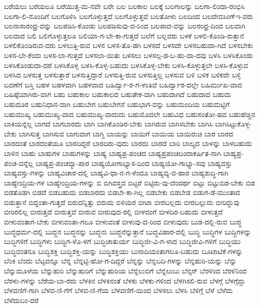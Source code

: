{ಬರೆಯಲು
ಬರೆಯಲೂ
ಬರೆಯುತ್ತ-ಮ-ನವೇ
ಬರೇ
ಬಲ
ಬಲಕಾಲ
ಬಲಕ್ಕೆ
ಬಲಗಾಲನ್ನು
ಬಲಗಾ-ಲಿಂದಾ-ರಂಭಿಸಿ
ಬಲಗಾ-ಲಿ-ನೊಂದಿಗೆ
ಬಲಗೊಳಿಸಿ
ಬಲಗೊಳ್ಳುತ್ತದೆ
ಬಲಗೊಳ್ಳುತ್ತವೆ
ಬಲತೋಳು
ಬಲದಿಂದ
ಬಲದೇವಸಿಂಗ್ಇ-ವರು
ಬಲನಾಸಾರಂಧ್ರ-ವನ್ನು
ಬಲಪಡಿಸಿ-ಕೊಂಡು
ಬಲಪಡಿಸುವು-ದ-ರಿಂದ
ಬಲಪಾದ-ವನ್ನು
ಬಲರಂಧ್ರ-ದಿಂದ
ಬಲವಾಗಿ
ಬಲವಾದ
ಬಲಿ
ಬಲಿಗೊಳ್ಳುತ್ತಲೂ
ಬಲಿಯಾ-ಗ-ಬೇ-ಕಾ-ಗುತ್ತದೆ
ಬಲೆಗೆ
ಬಲ್ಲವರು
ಬಳಕೆ
ಬಳಲಿ-ಕೊಂಡಿ-ರುತ್ತಾನೆ
ಬಳಲಿಕೊಂಡಿರುವ-ವರು
ಬಳಲುತ್ತಿ-ರುವ
ಬಳಸ
ಬಳಸ-ತೊ-ಡಗಿ
ಬಳಸದೆ
ಬಳಸದೇ
ಬಳಸಬಹುದಾ-ಗಿದೆ
ಬಳಸಬೇಕು
ಬಳಸ-ಬೇ-ಕೆಂದು
ಬಳಸ-ಲಾ-ಗುತ್ತದೆ
ಬಳಸಲಾ-ಯಿತು
ಬಳಸಲು
ಬಳಸಲ್ಪ-ಡ-ಬ-ಹು-ದಾ-ದವು
ಬಳಸಿ
ಬಳಸಿಕೊಂಡು
ಬಳಸಿಕೊಂಡುದಾ-ದರೆ
ಬಳಸಿಕೊಳ್ಳ
ಬಳಸಿ-ಕೊಳ್ಳ-ಬಹುದು
ಬಳಸಿಕೊಳ್ಳ-ಬೇಕು
ಬಳಸಿ-ಕೊಳ್ಳುತ್ತಲೇ
ಬಳಸಿ-ಕೊಳ್ಳುವ
ಬಳಸಿದ
ಬಳಸುತ್ತ
ಬಳಸುತ್ತಾರೆ
ಬಳಸುತ್ತಿದ್ದಾರೆ
ಬಳಸುತ್ತಿ-ರುವ
ಬಳಸುತ್ತಿಲ್ಲ
ಬಳಸುವ
ಬಳಿ
ಬಳಿಕ
ಬಳಿಕವೇ
ಬಳ್ಳಿ
ಬವಣೆಗೆ
ಬಸ್ತಿ
ಬಹಳ
ಬಹಳವಾಗಿ
ಬಹಳವಾದ
ಬಹಿರ್ದ್ವಾ-ರ-ಗ-ಳಂತಿವೆ
ಬಹಿರ್ದ್ವಾರ-ದಲ್ಲೇ
ಬಹಿರ್ಮುಖ-ವಾದ
ಬಹಿಷ್ಠೆಯಾಗಿರು-ವಾಗ
ಬಹು
ಬಹುಕಾಲ
ಬಹುಕಾಲದ
ಬಹುತೇಕ-ವಾಗಿ
ಬಹುದಾಗಿದೆ
ಬಹುದಾದ
ಬಹುದು
ಬಹುದೂರ
ಬಹುನಿಧಾನ-ವಾಗಿ
ಬಹುಬೇಗ
ಬಹುಬೇಗನೆ
ಬಹುಭಾಗ-ವನ್ನು
ಬಹುಮಂದಿಯ
ಬಹುಮಟ್ಟಿಗೆ
ಬಹುಮುಖ್ಯ
ಬಹುಮುಖ್ಯ-ವಾದ
ಬಹುಮುಖ್ಯ-ವಾದುದು
ಬಹುಮೊದಲೇ
ಬಹುವಿಧ
ಬಹುಸಂತೋ-ಷದ
ಬಹುಹೆಚ್ಚಿನ
ಬಾಕಿಯನ್ನೆಲ್ಲ
ಬಾಗದೆ
ಬಾಗಬಾರದು
ಬಾಗಿ
ಬಾಗಿಕೊಂಡಿರ-ಬೇಕು
ಬಾಗಿರುವ
ಬಾಗಿಸಬೇಕು
ಬಾಗಿಸಿ
ಬಾಗಿಸಿಟ್ಟುಕೊಳ್ಳ-ಬೇಕು
ಬಾಗಿಸುತ್ತ
ಬಾಗಿಸುವ
ಬಾಗುವಾಗ
ಬಾಗ್ಚಿ
ಬಾಯನ್ನು
ಬಾಯಿಗೆ
ಬಾಯಿಯ
ಬಾಯಿರುಚಿ
ಬಾರ
ಬಾರದ
ಬಾರದಂತೆ
ಬಾರದಂತೆಯೂ
ಬಾರದಿದ್ದರೆ
ಬಾರದಿರು-ವುದು
ಬಾರದು
ಬಾರದೆ
ಬಾರಿ
ಬಾಲ್ಯದ
ಬಾಳನ್ನು
ಬಾಳಬಹುದು
ಬಾಳಿನ
ಬಾಹು
ಬಾಹುಗಳ
ಬಾಹುಗಳನ್ನು
ಬಾಹ್ಯ
ಬಾಹ್ಯಪ್ರ-ಪಂಚದ
ಬಾಹ್ಯಪ್ರಪಂಚದಿಂದಾಕರ್ಷಿತ-ನಾಗಿ
ಬಾಹ್ಯಪ್ರ-ಪಂಚ-ವನ್ನೆಲ್ಲ
ಬಾಹ್ಯಪ್ರ-ಪಂಚವ್ಯಾ-ಪಾರ
ಬಾಹ್ಯಯೋಗಾಭ್ಯಾಸ-ದಿಂದ
ಬಾಹ್ಯಯೋ-ಗಾಭ್ಯಾ-ಸವು
ಬಾಹ್ಯವಸ್ತು
ಬಾಹ್ಯವಸ್ತು-ಗಳನ್ನು
ಬಾಹ್ಯವಿಚಾರ-ದಲ್ಲಿ
ಬಾಹ್ಯವಿ-ಧಾ-ನ-ಗ-ಳೆಂದೂ
ಬಾಹ್ಯವ್ಯ-ವ-ಹಾರ
ಬಾಹ್ಯಶುದ್ಧಿ-ಗಾಗಿ
ಬಾಹ್ಯೇಂದ್ರಿಯ-ಗಳ
ಬಾಹ್ಯೇಂದ್ರಿಯ-ಗಳನ್ನು
ಬಿ
ಬಿಗಿವಸ್ತ್ರದ
ಬಿಟ್ಟರೆ
ಬಿಟ್ಟಿರು-ವು-ದೆಂದರ್ಥ
ಬಿಟ್ಟು
ಬಿಟ್ಟುಬಿಡ-ಬೇಕು
ಬಿಡ
ಬಿಡತೊಡಗಿ
ಬಿಡದೆ
ಬಿಡಬಹುದು
ಬಿಡಬಾರದು
ಬಿಡಬೇ-ಕಾ-ಗಿಲ್ಲ
ಬಿಡಬೇಕು
ಬಿಡಬೇಡ
ಬಿಡುಗ-ಡೆ-ಮುಂತಾದ
ಬಿಡುತ್ತಾನೆ
ಬಿದ್ದಂತಾ-ಗುತ್ತದೆ
ಬಿರುದನ್ನಿತ್ತು
ಬಿರುದು
ಬಿಳಿಯರ
ಬೀಟಾ
ಬೀರಬಲ್ಲದು
ಬೀರಬಲ್ಲುದು
ಬೀರಿದ್ದುವು
ಬೀರಿರಲಿಲ್ಲ
ಬೀರುತ್ತದೆ
ಬೀರುತ್ತವೆ
ಬೀರುವ
ಬೀರುವುದ-ರಲ್ಲಿ
ಬೀಳದಂಗೆ
ಬೀಳದಿರ-ಬಹುದು
ಬೀಳುತ್ತದೆ
ಬೀಳುವಂತಾಗ-ಬೇಕು
ಬೀಳುವಂತಾ-ಗಲೂ
ಬೀಳುವಂತೆ
ಬೀಳುವು-ದ-ರಿಂದ
ಬೀಳುವುದು
ಬುಡ-ದಲ್ಲಿ-ರುವ
ಬುದ್ಧ
ಬುದ್ಧಧರ್ಮ-ದಲ್ಲಿ
ಬುದ್ಧನ
ಬುದ್ಧನನ್ನು
ಬುದ್ಧನು
ಬುದ್ಧನೆನ್ನುತ್ತಾನೆ
ಬುದ್ಧವಿಹಾರ-ದಲ್ಲಿ
ಬುದ್ಧಿ
ಬುದ್ಧಿಗಳ
ಬುದ್ಧಿಗಳನ್ನು
ಬುದ್ಧಿಗಳಿಗೆ
ಬುದ್ಧಿಗಳು
ಬುದ್ಧಿಗ-ಳೊ-ಳಗೆ
ಬುದ್ಧಿಚಾತುರ್ಯ
ಬುದ್ಧಿಜೀ-ವಿ-ಗ-ಳಾದ
ಬುದ್ಧಿಜೀವಿ-ಗಳಿಗೆ
ಬುದ್ಧಿಯು
ಬುದ್ಧಿವಂತನೂ
ಬುದ್ಧಿಶಕ್ತಿ
ಬುದ್ಧಿಶಕ್ತಿ-ಯನ್ನು
ಬುದ್ಧಿಶಕ್ತಿಯು
ಬುನಾದಿಯಂತಾಗಲೂ-ಬಹುದು
ಬೂಟಾಟಿಕೆ-ಗಳನ್ನು
ಬೆಂಕಿ
ಬೆಂದು
ಬೆಟ್ಟವನ್ನೂ
ಬೆನ್ನ
ಬೆನ್ನಟ್ಟಿ-ಹೋ-ಗ-ದಿದ್ದರೆ
ಬೆನ್ನನ್ನು
ಬೆನ್ನಬದಿ-ಗಳನ್ನು
ಬೆನ್ನಹುರಿ-ಯನ್ನು
ಬೆನ್ನು
ಬೆನ್ನುಮೂಳೆಯ
ಬೆನ್ನುಹುರಿ
ಬೆನ್ನುಹುರಿಗೆ
ಬೆನ್ನುಹುರಿಯ
ಬೆನ್ನೆಲುಬಿಗೆ
ಬೆನ್ನೆಲುಬು
ಬೆನ್ಸನ್
ಬೆರಳಿಂದ
ಬೆರಳಿನಿಂದ
ಬೆರಳು-ಗಳನ್ನು
ಬೆರೆಯ-ಬಾ-ರದು
ಬೆಳಕಿನ
ಬೆಳಕಿನಂತೆ
ಬೆಳಕು
ಬೆಳಕು-ಗಳಿಂದ
ಬೆಳಗಿಸಲಿ-ರುವ
ಬೆಳಗ್ಗೆ
ಬೆಳಗ್ಗೆದ್ದು
ಬೆಳವಣಿಗೆ-ಗಾಗಿ
ಬೆಳವ-ಣಿ-ಗೆಗೆ
ಬೆಳವ-ಣಿ-ಗೆಯ
ಬೆಳವಣಿಗೆ-ಯಿಂದ
ಬೆಳಸಲು
ಬೆಳಸಿ
ಬೆಳಿಗ್ಗೆ
ಬೆಳೆ
ಬೆಳೆದು
ಬೆಳೆದುಬಂ-ದರೆ
}
